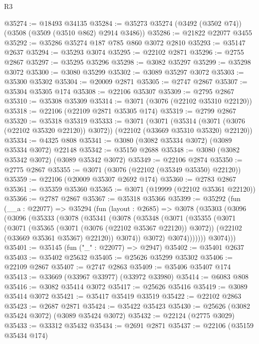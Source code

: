 \begin{lexlean}{R3}
\begin{coremodule}
@35274 := @18493 @34135
@35284 := @35273 @35274 (@3492 (@3502 @74)) (@3508 (@3509 (@3510 @862) @2914 @3486))
@35286 := @21822 @22077 @3455
@35292 := @35286 @35274 @187 @785 @860 @3072 @2810
@35293 := @35147 @2637
@35294 := @35293 @3074
@35295 := @22102 @2871
@35296 := @2755 @2867
@35297 := @35295 @35296
@35298 := @3082 @35297
@35299 := @35298 @3072
@35300 := @3080 @35299
@35302 := @3089 @35297 @3072
@35303 := @35300 @35302
@35304 := @20009 @2871
@35305 := @2747 @2867
@35307 := @35304 @35305 @174
@35308 := @22106 @35307
@35309 := @2795 @2867
@35310 := @35308 @35309
@35314 := @3071 (@3076 (@22102 @35310 @22120))
@35318 := @22106 (@22109 @2871 @35305 @174)
@35319 := @2799 @2867
@35320 := @35318 @35319
@35333 := @3071
    (@3071
      (@35314 (@3071 (@3076 (@22102 @35320 @22120)) @3072))
      (@22102 (@33669 @35310 @35320) @22120))
@35334 := @4325 @808
@35341 := @3080 (@3082 @35334 @3072) (@3089 @35334 @3072) @22148
@35342 := @35150 @2688
@35348 := @3080 (@3082 @35342 @3072) (@3089 @35342 @3072)
@35349 := @22106 @2874
@35350 := @2775 @2867
@35355 := @3071 (@3076 (@22102 (@35349 @35350) @22120))
@35359 := @22106 (@20009 @35307 @2692 @174)
@35360 := @2783 @2867
@35361 := @35359 @35360
@35365 := @3071 (@19999 (@22102 @35361 @22120))
@35366 := @2787 @2867
@35367 := @35318 @35366
@35399 := @35292
    (fun (__a : @22077) =>
    @35294
      (fun (layout : @2685) =>
      @3078
        (@35303
          (@3096
            (@3096
              (@35333
                (@3078
                  (@35341
                    (@3078
                      (@35348
                        (@3071
                          (@35355
                            (@3071
                              (@3071
                                (@35365 (@3071 (@3076 (@22102 @35367 @22120)) @3072))
                                (@22102 (@33669 @35361 @35367) @22120))
                              @3074))
                          @3072)
                        @3074)))))))
          @3074)))
@35401 := @35145 (fun ("_" : @22077) => @2947)
@35402 := @35401 @2637
@35403 := @35402 @25632
@35405 := @25626 @35299 @35302
@35406 := @22109 @2867
@35407 := @2747 @2863
@35409 := @35406 @35407 @174
@35413 := @33669 (@33967 @33977) (@33972 @33980)
@35414 := @6083 @808
@35416 := @3082 @35414 @3072
@35417 := @25626 @35416
@35419 := @3089 @35414 @3072
@35421 := @35417 @35419 @33519
@35422 := @22102 @2863
@35423 := @2687 @2871
@35424 := @35422 @35423
@35430 := @25626 (@3082 @35424 @3072) (@3089 @35424 @3072)
@35432 := @22124 (@2775 @3029)
@35433 := @33312 @35432
@35434 := @2691 @2871
@35437 := @22106 (@35159 @35434 @174)

\end{coremodule}
\end{lexlean}
